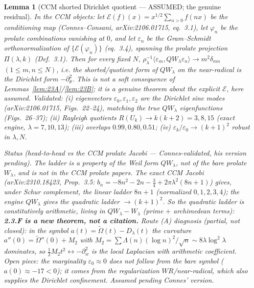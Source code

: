 \documentclass[11pt]{amsart}
\newtheorem{lemma}[theorem]{Lemma}
\theoremstyle{definition}
\theoremstyle{remark}
\newcommand{\ve}{\varepsilon}
\begin{document}
\begin{lemma}[CCM shorted Dirichlet quotient --- ASSUMED; the genuine residual]\label{lem:23F}
In the CCM objects: let $\mathcal{E}(f)(x)=x^{1/2}\sum_{n>0}f(nx)$ be the conditioning map
(Connes--Consani, arXiv:2106.01715, eq.~3.1), let $\varphi_n$ be the prolate combinations
vanishing at $0$, and let $\varepsilon_n$ be the Gram--Schmidt orthonormalization of
$\{\mathcal{E}(\varphi_n)\}$ (eq.~3.4), spanning the prolate projection $\Pi(\lambda,k)$
(Def.~3.1). Then for every fixed $N$,
$\rho_\lambda^{-1}\langle\varepsilon_m,QW_\lambda\varepsilon_n\rangle\to m^2\delta_{mn}$
$(1\le m,n\le N)$, i.e. the shorted/quotient form of $QW_\lambda$ on the near-radical is
the Dirichlet form $-\partial_\theta^2$. This is not a soft consequence of
Lemmas~\ref{lem:23A}/\ref{lem:23B}; it is a genuine theorem about the explicit
$\mathcal{E}$, here assumed. Validated: (i) eigenvectors $\varepsilon_0,\varepsilon_1,\varepsilon_2$
are the Dirichlet sine modes (arXiv:2106.01715, Figs.~22--24), matching the true
$QW_\lambda$ eigenfunctions (Figs.~26--37); (ii) Rayleigh quotients
$R(U_k)\to k(k+2)=3,8,15$ (exact engine, $\lambda=7,10,13$); (iii) overlaps
$0.99,0.80,0.51$; (iv) $\ve_k/\ve_0\to(k+1)^2$ robust in $\lambda,N$.

\emph{Status (head-to-head vs the CCM prolate Jacobi --- Connes-validated, his
version pending).} The ladder is a property of the Weil form $QW_\lambda$, \emph{not} of the
bare prolate $W_\lambda$, and is not in the CCM prolate papers. The exact CCM Jacobi
(arXiv:2310.18423, Prop.~3.5: $b_n=-8n^2-2n-\tfrac34+2\pi\lambda^2(8n+1)$) gives, under Schur
complement, the \emph{linear} ladder $8n+1$ (normalized $0,1,2,3,4$); the engine $QW_\lambda$
gives the \emph{quadratic} ladder $\to(k+1)^2$. So the quadratic ladder is constitutively
arithmetic, living in $QW_\lambda-W_\lambda$ (prime $+$ archimedean terms): \textbf{2.3.F is a
new theorem, not a citation.} Route (A) diagnosis (partial, not closed): in the symbol
$a(t)=\widetilde\Omega(t)-D_\lambda(t)$ the curvature $a''(0)=\widetilde\Omega''(0)+M_2$ with
$M_2=\sum\Lambda(n)(\log n)^2/\sqrt n\sim8\lambda\log^2\lambda$ dominates, so $\tfrac12 M_2 t^2
\leftrightarrow-\partial_w^2$ is the local Laplacian with arithmetic coefficient. Open piece:
the marginality $\ve_0\approx0$ does not follow from the bare symbol ($a(0)\approx-17<0$); it
comes from the regularization $WR$/near-radical, which also supplies the Dirichlet
confinement. Assumed pending Connes' version.
\end{lemma}
\end{document}
